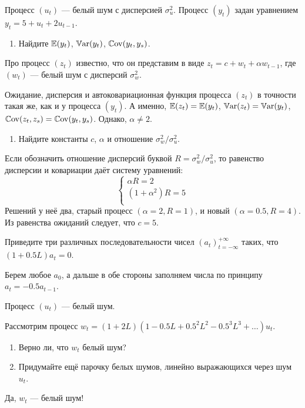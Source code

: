 \begin{problem}
Процесс $(u_t)$ — белый шум с дисперсией $\sigma^2_u$. 
Процесс $(y_t)$ задан уравнением  $y_t = 5 + u_t + 2u_{t-1}$.

\begin{enumerate}
  \item Найдите $\operatorname{\mathbb{E}}(y_t)$, $\operatorname{\mathbb{V}\mathrm{ar}}(y_t)$, $\operatorname{\mathbb{C}\mathrm{ov}}(y_t, y_s)$.
\end{enumerate}

Про процесс $(z_t)$ известно, что он представим в виде 
$z_t = c + w_t + \alpha w_{t-1}$, где $(w_t)$ — белый шум с дисперсий $\sigma^2_w$.

Ожидание, дисперсия и автоковариационная функция процесса $(z_t)$ в точности такая же, 
как и у процесса $(y_t)$. А именно, $\operatorname{\mathbb{E}}(z_t) = \operatorname{\mathbb{E}}(y_t)$, $\operatorname{\mathbb{V}\mathrm{ar}}(z_t) = \operatorname{\mathbb{V}\mathrm{ar}}(y_t)$,
$\operatorname{\mathbb{C}\mathrm{ov}}(z_t, z_s) = \operatorname{\mathbb{C}\mathrm{ov}}(y_t, y_s)$. Однако, $\alpha \neq 2$.

\begin{enumerate}[resume]
  \item Найдите константы $c$, $\alpha$ и отношение $\sigma^2_w/\sigma^2_u$.
\end{enumerate}
  
  \begin{sol}
Если обозначить отношение дисперсий буквой $R = \sigma^2_w/\sigma^2_u$,
то равенство дисперсии и ковариации даёт систему уравнений: 
\[
  \begin{cases}
    \alpha R = 2 \\
    (1+\alpha^2)R = 5 \\
  \end{cases}
\]
Решений у неё два, старый процесс $(\alpha=2, R=1)$, и новый $(\alpha=0.5, R=4)$.
Из равенства ожиданий следует, что $c=5$.
  \end{sol}
\end{problem}


\begin{problem}
Приведите три различных последовательности чисел $(a_t)_{t=-\infty}^{+\infty}$ таких, 
что $(1+0.5L)a_t = 0$.

  \begin{sol}
    Берем любое $a_0$, а дальше в обе стороны заполняем числа по принципу $a_t = -0.5 a_{t-1}$.
  \end{sol}
\end{problem}


\begin{problem}
  Процесс $(u_t)$ — белый шум.

  Рассмотрим процесс $w_t = (1+2L)(1-0.5L + 0.5^2 L^2 - 0.5^3 L^3 + \ldots )u_t$.

  \begin{enumerate}
    \item Верно ли, что $w_t$ белый шум?
    \item Придумайте ещё парочку белых шумов, линейно выражающихся через шум $u_t$.
  \end{enumerate}

  \begin{sol}
    Да, $w_t$ — белый шум!
  \end{sol}
\end{problem}





